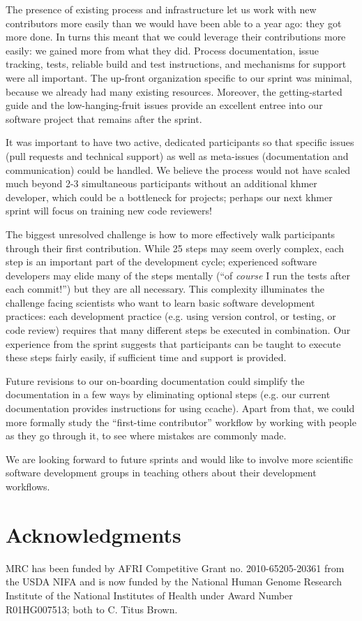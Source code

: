 \documentclass[11pt]{article}
\begin{document}
The presence of existing process and infrastructure let us work with
new contributors more easily than we would have been able to a year
ago: they got more done.  In turns this meant that we could leverage
their contributions more easily: we gained more from what they did.
Process documentation, issue tracking, tests, reliable build and test
instructions, and mechanisms for support were all important.  The
up-front organization specific to our sprint was minimal, because we
already had many existing resources.  Moreover, the getting-started
guide and the low-hanging-fruit issues provide an excellent entree
into our software project that remains after the sprint.

It was important to have two active, dedicated participants so that
specific issues (pull requests and technical support) as well as
meta-issues (documentation and communication) could be handled.  We
believe the process would not have scaled much beyond 2-3 simultaneous
participants without an additional khmer developer, which could be a
bottleneck for projects; perhaps our next khmer sprint will focus on
training new code reviewers!

The biggest unresolved challenge is how to more effectively walk
participants through their first contribution.  While 25 steps may
seem overly complex, each step is an important part of the development
cycle; experienced software developers may elide many of the steps
mentally (``of {\em course} I run the tests after each commit!'') but
they are all necessary.  This complexity illuminates the challenge
facing scientists who want to learn basic software development
practices: each development practice (e.g. using version control, or
testing, or code review) requires that many different steps be
executed in combination.  Our experience from the sprint suggests that
participants can be taught to execute these steps fairly easily, if
sufficient time and support is provided.

Future revisions to our on-boarding documentation could simplify the
documentation in a few ways by eliminating optional steps (e.g. our current
documentation provides instructions for using ccache).  Apart from that,
we could more formally study the ``first-time contributor'' workflow
by working with people as they go through it, to see where mistakes
are commonly made.

We are looking forward to future sprints and would like to involve more
scientific software development groups in teaching others about their
development workflows.



\section*{Acknowledgments}

MRC has been funded by AFRI Competitive Grant no. 2010-65205-20361
from the USDA NIFA and is now funded by the National Human Genome
Research Institute of the National Institutes of Health under Award
Number R01HG007513; both to C. Titus Brown.



\end{document}
